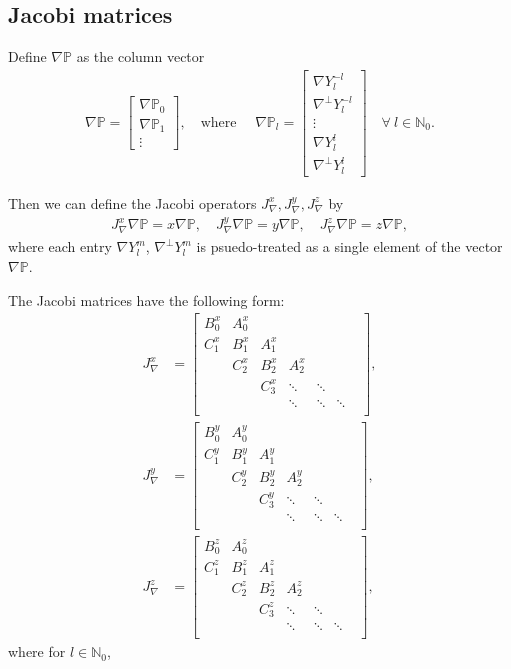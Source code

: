 \documentclass[11pt, oneside]{article}   	%
\newcommand{\No}{\mathbb{N}_0}
\newcommand{\gradP}{\nabla\mathbb{P}}
\newcommand{\gradY}{\nabla Y}
\newcommand{\gradYlm}{\nabla Y^m_l}
\newcommand{\gradpY}{\nabla^\perp Y}
\newcommand{\gradpYlm}{\nabla^\perp Y^m_l}
\begin{document}
\subsection{Jacobi matrices}

Define \(\gradP\) as the column vector
\begin{align}
\gradP = \begin{bmatrix} \gradP_0 \\ \gradP_1 \\ \vdots \end{bmatrix}, \quad \text{where } \quad \gradP_l = \begin{bmatrix} \gradY^{-l}_l \\ \gradpY^{-l}_l \\ \vdots \\ \gradY^{l}_l \\ \gradpY^{l}_l  \end{bmatrix} \quad \forall \: l \in \No.
\end{align}

Then we can define the Jacobi operators \(J_\nabla^x, J_\nabla^y, J_\nabla^z\) by 
\begin{align}
J_\nabla^x \gradP = x \gradP, \quad J_\nabla^y \gradP = y \gradP, \quad J_\nabla^z \gradP = z \gradP,
\end{align}
where each entry \(\gradYlm\), \(\gradpYlm\) is psuedo-treated as a single element of the vector \(\gradP\).

The Jacobi matrices have the following form:
\begin{align}
J_\nabla^x &= \begin{bmatrix}
		B^x_0 & A^x_0 & & & & \\
		C^x_1 & B^x_1 & A^x_1 & & & \\
		& C^x_2 & B^x_2 & A^x_2  & & & \\
		& & C^x_3 & \ddots & \ddots & \\
		& & & \ddots & \ddots & \ddots \\
	\end{bmatrix}, \\
J_\nabla^y &= \begin{bmatrix}
		B^y_0 & A^y_0 & & & & \\
		C^y_1 & B^y_1 & A^y_1 & & & \\
		& C^y_2 & B^y_2 & A^y_2  & & & \\
		& & C^y_3 & \ddots & \ddots & \\
		& & & \ddots & \ddots & \ddots \\
	\end{bmatrix}, \\
J_\nabla^z &= \begin{bmatrix}
		B^z_0 & A^z_0 & & & & \\
		C^z_1 & B^z_1 & A^z_1 & & & \\
		& C^z_2 & B^z_2 & A^z_2  & & & \\
		& & C^z_3 & \ddots & \ddots & \\
		& & & \ddots & \ddots & \ddots \\
	\end{bmatrix},
\end{align}
where for \(l \in \No\),
\end{document}
